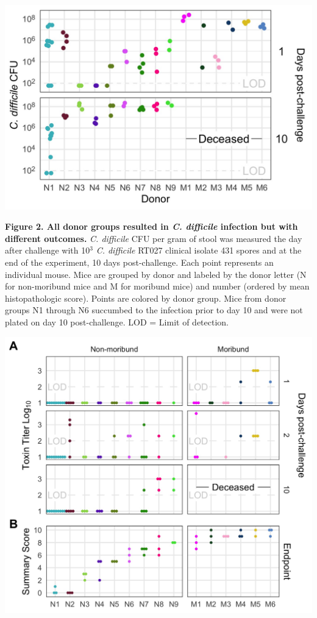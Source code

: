 \documentclass[
  12pt,
]{article}
\begin{document}
\includegraphics{../results/figures/figure_2.jpg}

\textbf{Figure 2. All donor groups resulted in \emph{C. difficile}
infection but with different outcomes.} \emph{C. difficile} CFU per gram
of stool was measured the day after challenge with 10\(^{3}\) \emph{C.
difficile} RT027 clinical isolate 431 spores and at the end of the
experiment, 10 days post-challenge. Each point represents an individual
mouse. Mice are grouped by donor and labeled by the donor letter (N for
non-moribund mice and M for moribund mice) and number (ordered by mean
histopathologic score). Points are colored by donor group. Mice from
donor groups N1 through N6 succumbed to the infection prior to day 10
and were not plated on day 10 post-challenge. LOD = Limit of detection.

\hfill\break

\includegraphics{../results/figures/figure_3.jpg}
\end{document}
